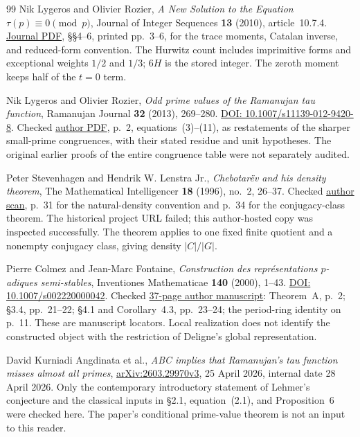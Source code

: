 \begin{thebibliography}{99}
Nik Lygeros and Olivier Rozier,
\emph{A New Solution to the Equation $\tau(p)\equiv0\pmod p$},
Journal of Integer Sequences \textbf{13} (2010), article~10.7.4.
\href{https://cs.uwaterloo.ca/journals/JIS/VOL13/Lygeros/lygeros5.pdf}{Journal PDF},
\S\S4--6, printed pp.~3--6, for the trace moments, Catalan inverse, and reduced-form convention.
The Hurwitz count includes imprimitive forms and exceptional weights $1/2$ and $1/3$; $6H$ is the stored integer. The zeroth moment keeps half of the $t=0$ term.

Nik Lygeros and Olivier Rozier,
\emph{Odd prime values of the Ramanujan tau function}, Ramanujan Journal \textbf{32} (2013), 269--280.
\href{https://doi.org/10.1007/s11139-012-9420-8}{DOI: 10.1007/s11139-012-9420-8}.
Checked \href{https://lygeros.org/wp-content/uploads/root/11713_Odd_prime_values_of_the_Ramanujan_tau_function.pdf}{author PDF},
p.~2, equations~(3)--(11), as restatements of the sharper small-prime congruences, with their stated residue and unit hypotheses. The original earlier proofs of the entire congruence table were not separately audited.

Peter Stevenhagen and Hendrik W. Lenstra Jr.,
\emph{Chebotar\"ev and his density theorem},
The Mathematical Intelligencer \textbf{18} (1996), no.~2, 26--37.
Checked \href{https://pub.math.leidenuniv.nl/~lenstrahw/PUBLICATIONS/1996d/art.pdf}{author scan},
p.~31 for the natural-density convention and p.~34 for the conjugacy-class theorem.
The historical project URL failed; this author-hosted copy was inspected successfully.
The theorem applies to one fixed finite quotient and a nonempty conjugacy class, giving density $|C|/|G|$.

Pierre Colmez and Jean-Marc Fontaine,
\emph{Construction des repr\'esentations $p$-adiques semi-stables},
Inventiones Mathematicae \textbf{140} (2000), 1--43.
\href{https://doi.org/10.1007/s002220000042}{DOI: 10.1007/s002220000042}.
Checked \href{https://webusers.imj-prg.fr/~pierre.colmez/CF.pdf}{37-page author manuscript}:
Theorem~A, p.~2; \S3.4, pp.~21--22; \S4.1 and Corollary~4.3, pp.~23--24; the period-ring identity on p.~11.
These are manuscript locators. Local realization does not identify the constructed object with the restriction of Deligne's global representation.

David Kurniadi Angdinata et al.,
\emph{ABC implies that Ramanujan's tau function misses almost all primes},
\href{https://arxiv.org/pdf/2603.29970}{arXiv:2603.29970v3},
25 April 2026, internal date 28 April 2026.
Only the contemporary introductory statement of Lehmer's conjecture and the classical inputs in \S2.1, equation~(2.1), and Proposition~6 were checked here. The paper's conditional prime-value theorem is not an input to this reader.


\end{thebibliography}
